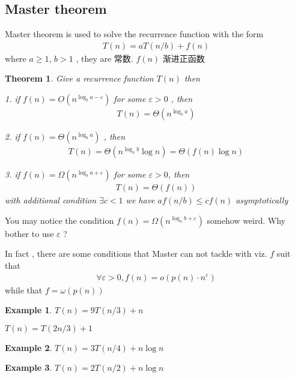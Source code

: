 \documentclass[a4paper, 10pt]{ctexart} %
\newtheorem{theorem}{Theorem}
\newtheorem{example}{Example}
\begin{document}
\subsection{Master theorem}
Master theorem is used to solve the recurrence function with the form 
\begin{align*}
    T \left(n\right) =  a T\left( n  / b\right) + f \left(n\right)
\end{align*}
where $a \ge 1$,  $b >1$ , they are 常数. $f \left(n\right)$ 渐进正函数

\begin{theorem}
    Give a recurrence function $T\left(n\right)$ then

    1. if $f\left(n\right) = O \left( n ^{\log _{b} a - \varepsilon}\right)$ for some $\varepsilon > 0$ , then 
    \begin{align*}
        T\left(n\right) = \Theta \left(n ^{\log _{b}a}\right)
    \end{align*}

    2. if $f \left(n\right) = \Theta \left(n ^{\log _{b} a}\right)$ , then 
    \begin{align*}
    T\left(n\right) = \Theta \left( n ^{\log _{a }b } \log  n\right) = \Theta \left(f \left(n\right) \log n    \right)
    \end{align*}

    3. if $f \left(n \right) = \Omega \left( n ^{\log _{b} a + \varepsilon}\right)$ for some $\varepsilon > 0$, then 
    \begin{align*}
        T\left(n\right) = \Theta \left(f \left(n\right)\right)
    \end{align*}
    with additional condition $\exists c < 1$ we have $a f \left( n  / b    \right) \le cf\left(n\right)$ asymptotically
\end{theorem}
\noindent You may notice the condition $f \left(n \right) = \Omega \left( n^{\log _{a} b + \varepsilon}\right)$ 
somehow weird. Why bother to use $\varepsilon$ ? 

\noindent In fact , there are some conditions that Master can not tackle with viz. $f$ suit that
\begin{align*}
    \forall  \varepsilon > 0 , f\left(n\right) = o \left( p \left(n\right) \cdot  n ^{\varepsilon}\right)
\end{align*}
while that $f = \omega \left(p \left(n\right)\right)$
\begin{example}
    $T\left(n \right) =   9  T\left( n / 3\right) + n$

    $T\left( n\right) = T\left( 2n /3\right) + 1$
\end{example}
\begin{example}
    $T\left(n\right)  =  3 T\left( n / 4\right) + n \log n$
\end{example}
\begin{example}
    $T\left(n\right) =      2  T \left( n /2\right) +  n\log n  $
\end{example}
\end{document}
